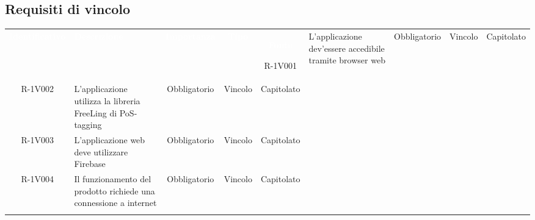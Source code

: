 \subsection{Requisiti di vincolo} 
\begin{tabularx}{\textwidth}{cXccc}
	
	\rowcolor{greySWEight}
	\textcolor{white}{\textbf{Identificativo}} &
	\textcolor{white}{\textbf{Descrizione}}&
	\textcolor{white}{\textbf{Importanza}}&
	\textcolor{white}{\textbf{Tipo}}&
	\textcolor{white}{\textbf{Fonte}}\endhead
	
	R-1V001 &
	
	L’applicazione dev'essere accedibile tramite browser web &
	
	Obbligatorio &
	
	Vincolo &
	
	Capitolato \\
	R-1V002 &
	
	L’applicazione utilizza la libreria FreeLing di PoS-tagging &
	
	Obbligatorio &
	
	Vincolo &
	
	Capitolato \\
	R-1V003 &
	
	L’applicazione web deve utilizzare Firebase &
	
	Obbligatorio &
	
	Vincolo &
	
	Capitolato \\
	R-1V004 &
	
	Il funzionamento del prodotto richiede una connessione a internet &
	
	Obbligatorio &
	
	Vincolo &
	
	Capitolato \\
	
	\caption{Tabella requisiti di vincolo} \label{tab:tabellarequisitivincolo}
\end{tabularx}


